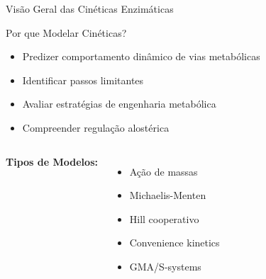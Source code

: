 \begin{frame}{Visão Geral das Cinéticas Enzimáticas}
\begin{block}{Por que Modelar Cinéticas?}
\begin{itemize}
    \item Predizer comportamento dinâmico de vias metabólicas
    \item Identificar passos limitantes
    \item Avaliar estratégias de engenharia metabólica
    \item Compreender regulação alostérica
\end{itemize}
\end{block}

\vspace{0.3cm}

\begin{columns}
\textbf{Tipos de Modelos:}
\begin{itemize}
    \item Ação de massas
    \item Michaelis-Menten
    \item Hill cooperativo
    \item Convenience kinetics
    \item GMA/S-systems
\end{itemize}

\begin{center}
\end{center}
\end{columns}
\end{frame}

